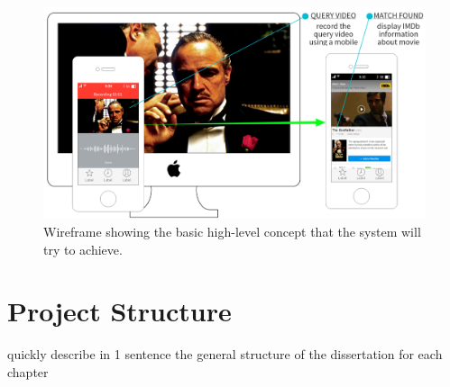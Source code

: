 \begin{figure}[h]
\centerline{\includegraphics[width=1.15\textwidth]{figures/system_wireframe.png}}
\caption{\label{fig:wireframe}Wireframe showing the basic high-level concept that the system will try to achieve.}
\end{figure}

\section{Project Structure}

quickly describe in 1 sentence the general structure of the dissertation for each chapter